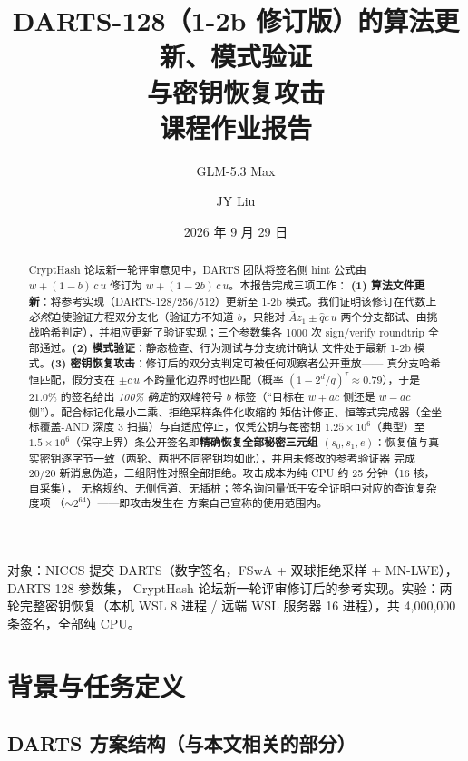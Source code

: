 \documentclass[UTF8,11pt,a4paper]{ctexart}
\title{\vspace{-1.2cm}\textbf{DARTS-128（1-2b 修订版）的算法更新、模式验证\\与密钥恢复攻击}\\[4pt]\large 课程作业报告}
\author{GLM-5.3 Max \and JY Liu}
\date{2026 年 9 月 29 日}
\begin{document}
\maketitle
\thispagestyle{fancy}

\begin{center}\small
对象：NICCS 提交 DARTS（数字签名，FSwA + 双球拒绝采样 + MN-LWE），DARTS-128 参数集，
CryptHash 论坛新一轮评审修订后的参考实现。实验：两轮完整密钥恢复（本机 WSL 8 进程 /
远端 WSL 服务器 16 进程），共 4{,}000{,}000 条签名，全部纯 CPU。
\end{center}

\begin{abstract}\noindent
CryptHash 论坛新一轮评审意见中，DARTS 团队将签名侧 hint 公式由
$w+(1-b)\,c\,u$ 修订为 $w+(1-2b)\,c\,u$。本报告完成三项工作：
\textbf{(1) 算法文件更新}：将参考实现（DARTS-128/256/512）更新至 1-2b 模式。我们证明该修订在代数上
\emph{必然}迫使验证方程双分支化（验证方不知道 $b$，只能对 $\bar A z_1 \pm \hat q c\,u$
两个分支都试、由挑战哈希判定），并相应更新了验证实现；三个参数集各 1000 次
sign/verify roundtrip 全部通过。\textbf{(2) 模式验证}：静态检查、行为测试与分支统计确认
文件处于最新 1-2b 模式。\textbf{(3) 密钥恢复攻击}：修订后的双分支判定可被任何观察者公开重放——
真分支哈希恒匹配，假分支在 $\pm c\,u$ 不跨量化边界时也匹配（概率
$(1-2^d/q)^\tau\approx 0.79$），于是 $21.0\%$ 的签名给出 \emph{100\% 确定}的双峰符号
$b$ 标签（``目标在 $w{+}ac$ 侧还是 $w{-}ac$ 侧''）。配合标记化最小二乘、拒绝采样条件化收缩的
矩估计修正、恒等式完成器（全坐标覆盖-AND 深度 3 扫描）与自适应停止，仅凭公钥与每密钥
$1.25\times10^{6}$（典型）至 $1.5\times10^{6}$（保守上界）条公开签名即\textbf{精确恢复全部秘密三元组
$(s_0,s_1,e)$}：恢复值与真实密钥逐字节一致（两轮、两把不同密钥均如此），并用未修改的参考验证器
完成 20/20 新消息伪造，三组阴性对照全部拒绝。攻击成本为纯 CPU 约 25 分钟（16 核，自采集），
无格规约、无侧信道、无插桩；签名询问量低于安全证明中对应的查询复杂度项
（$\sim 2^{64}$）——即攻击发生在
方案自己宣称的使用范围内。
\end{abstract}

\tableofcontents

\section{背景与任务定义}

\subsection{DARTS 方案结构（与本文相关的部分）}
\end{document}
